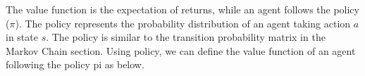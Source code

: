 The value function is the expectation of returns, while an agent follows the policy (\(\pi\)). The policy represents the probability distribution of an agent taking action \(a\) in state \(s\). The policy is similar to the transition probability matrix in the Markov Chain section. Using policy, we can define the value function of an agent following the policy pi as below.